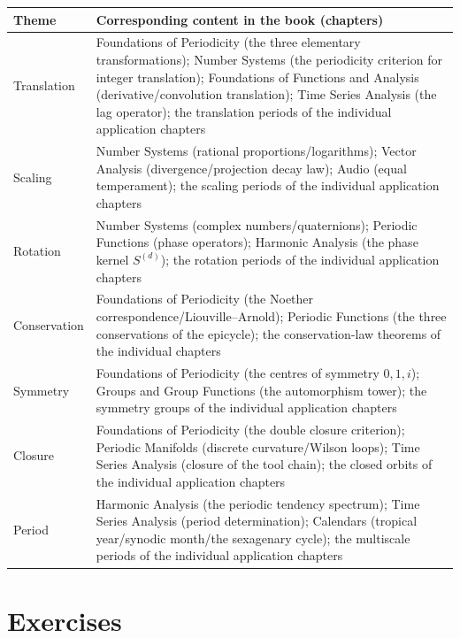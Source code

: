 \begin{center}
\renewcommand{\arraystretch}{1.3}
\begin{tabularx}{\linewidth}{@{}>{\raggedright\arraybackslash\hspace{0pt}}p{2.8cm} >{\raggedright\arraybackslash\hspace{0pt}}X@{}}
\toprule
Theme & Corresponding content in the book (chapters) \\
\midrule
Translation & Foundations of Periodicity (the three elementary transformations); Number Systems (the periodicity criterion for integer translation); Foundations of Functions and Analysis (derivative/convolution translation); Time Series Analysis (the lag operator); the translation periods of the individual application chapters \\
Scaling & Number Systems (rational proportions/logarithms); Vector Analysis (divergence/projection decay law); Audio (equal temperament); the scaling periods of the individual application chapters \\
Rotation & Number Systems (complex numbers/quaternions); Periodic Functions (phase operators); Harmonic Analysis (the phase kernel $S^{(d)}$); the rotation periods of the individual application chapters \\
Conservation & Foundations of Periodicity (the Noether correspondence/Liouville--Arnold); Periodic Functions (the three conservations of the epicycle); the conservation-law theorems of the individual chapters \\
Symmetry & Foundations of Periodicity (the centres of symmetry $0,1,i$); Groups and Group Functions (the automorphism tower); the symmetry groups of the individual application chapters \\
Closure & Foundations of Periodicity (the double closure criterion); Periodic Manifolds (discrete curvature/Wilson loops); Time Series Analysis (closure of the tool chain); the closed orbits of the individual application chapters \\
Period & Harmonic Analysis (the periodic tendency spectrum); Time Series Analysis (period determination); Calendars (tropical year/synodic month/the sexagenary cycle); the multiscale periods of the individual application chapters \\
\bottomrule
\end{tabularx}
\end{center}


\section*{Exercises}

